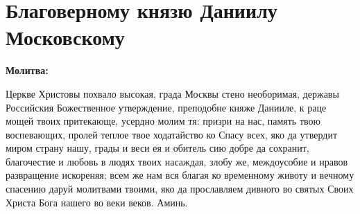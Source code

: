 \bigskip\bigskip\mychapterending


 

\longpage{}

{\bigskip\noparindent\begin{minipage}{\textwidth}
\section{Благоверному князю Даниилу Московскому}
 
\restoreparindent\bfseries Молитва:\normalfont{}

Церкве Христовы похвало высокая, града Москвы стено необоримая, державы Российския Божественное утверждение, преподобне княже Данииле, к раце мощей твоих притекающе, усердно молим тя: призри на нас, память твою воспевающих, пролей теплое твое ходатайство ко Спасу всех, яко да утвердит миром страну нашу, грады и веси ея и обитель сию добре да сохранит, благочестие и любовь в людях твоих насаждая, злобу же, междоусобие и нравов развращение искореняя; всем же нам вся благая ко временному животу и вечному спасению даруй молитвами твоими, яко да прославляем дивного во святых Своих Христа Бога нашего во веки веков. Аминь.
\end{minipage}}

